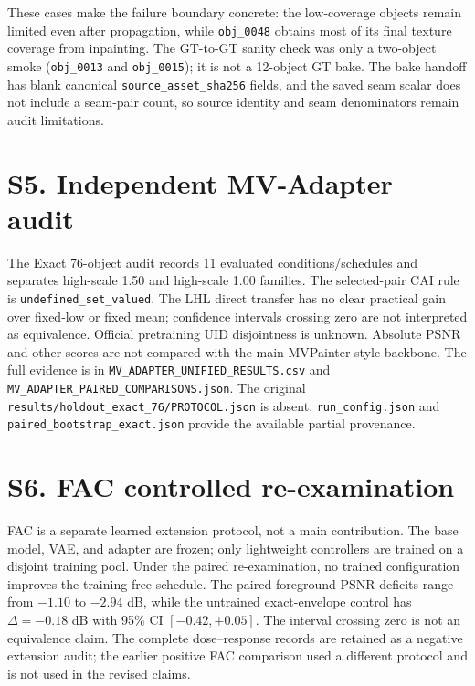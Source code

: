 \documentclass[10pt]{article}
\begin{document}
These cases make the failure boundary concrete: the low-coverage objects
remain limited even after propagation, while \texttt{obj\_0048} obtains most
of its final texture coverage from inpainting. The GT-to-GT sanity check was
only a two-object smoke (\texttt{obj\_0013} and \texttt{obj\_0015}); it is not
a 12-object GT bake. The bake handoff has blank canonical
\texttt{source\_asset\_sha256} fields, and the saved seam scalar does not
include a seam-pair count, so source identity and seam denominators remain
audit limitations.

\section{S5. Independent MV-Adapter audit}

The Exact 76-object audit records 11 evaluated conditions/schedules and
separates high-scale 1.50 and high-scale 1.00 families. The selected-pair CAI rule is
\texttt{undefined\_set\_valued}. The LHL direct transfer has no clear
practical gain over fixed-low or fixed mean; confidence intervals crossing
zero are not interpreted as equivalence. Official pretraining UID
disjointness is unknown. Absolute PSNR and other scores are not compared with
the main MVPainter-style backbone. The full evidence is in
\texttt{MV\_ADAPTER\_UNIFIED\_RESULTS.csv} and
\texttt{MV\_ADAPTER\_PAIRED\_COMPARISONS.json}.
The original \texttt{results/holdout\_exact\_76/PROTOCOL.json} is absent;
\texttt{run\_config.json} and \texttt{paired\_bootstrap\_exact.json} provide
the available partial provenance.

\section{S6. FAC controlled re-examination}

FAC is a separate learned extension protocol, not a main contribution. The
base model, VAE, and adapter are frozen; only lightweight controllers are
trained on a disjoint training pool. Under the paired re-examination, no
trained configuration improves the training-free schedule. The paired
foreground-PSNR deficits range from $-1.10$ to $-2.94$ dB, while the
untrained exact-envelope control has $\Delta=-0.18$ dB with 95\% CI
$[-0.42,+0.05]$. The interval crossing zero is not an equivalence claim.
The complete dose--response records are retained as a negative extension
audit; the earlier positive FAC comparison used a different protocol and is
not used in the revised claims.
\end{document}
